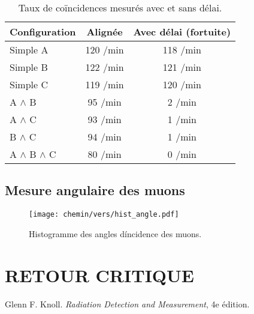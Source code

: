 \documentclass[a4paper]{article}
\begin{document}
    \begin{table}[H]
        \centering
        \begin{tabular}{lcc}
            \toprule
            \textbf{Configuration} & \textbf{Align\'ee} & \textbf{Avec d\'elai (fortuite)} \\
            \midrule
            Simple A & 120 /min & 118 /min \\
            Simple B & 122 /min & 121 /min \\
            Simple C & 119 /min & 120 /min \\
            A $\wedge$ B & 95 /min & 2 /min \\
            A $\wedge$ C & 93 /min & 1 /min \\
            B $\wedge$ C & 94 /min & 1 /min \\
            A $\wedge$ B $\wedge$ C & 80 /min & 0 /min \\
            \bottomrule
        \end{tabular}
        \caption{Taux de co\"incidences mesur\'es avec et sans d\'elai.}
        \label{tab:coincidences}
    \end{table}
    
    \subsection{Mesure angulaire des muons}
    
    \begin{figure}[H]
        \centering
        \texttt{[image: chemin/vers/hist\_angle.pdf]}
        \caption{Histogramme des angles d\'incidence des muons.}
        \label{fig:hist_angle}
    \end{figure}
    
    \section{RETOUR CRITIQUE}
    
    
    \begin{thebibliography}{}
         Glenn F. Knoll. \textit{Radiation Detection and Measurement}, 4e \'edition.
    \end{thebibliography}
	
\end{document}
